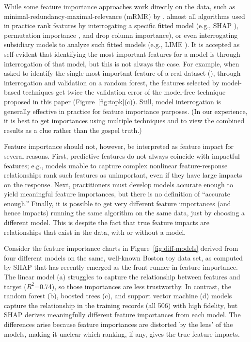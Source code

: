 \documentclass[11pt]{article}
\newcommand{\figref}[1]{Figure~\ref{#1}}
\begin{document}
While some feature importance approaches work directly on the data, such as minimal-redundancy-maximal-relevance (mRMR) by \cite{mRMR}, almost all algorithms used in practice rank features by interrogating a specific fitted model (e.g., SHAP \citep{shap}), permutation importance \citep{RF}, and drop column importance), or even interrogating subsidiary models to analyze such fitted models (e.g., LIME \citealt{lime}). It is accepted as self-evident that identifying the most important features for a model is through interrogation of that  model, but this is not always the case.  For example, when asked to identify the single most important feature of a real dataset (\citep{bulldozer}), through interrogation and validation on a random forest, the features selected by model-based techniques get twice the validation error of the model-free technique proposed in this paper (\figref{fig:topk}(c)). Still, model interrogation is generally effective in practice for feature importance purposes. (In our experience, it is best to get importances using multiple techniques and to view the combined results as a clue rather than the gospel truth.)

Feature importance should not, however, be interpreted as feature impact for several reasons. First, predictive features do not always coincide with impactful features; e.g., models unable to capture complex nonlinear feature-response relationships rank such features as unimportant, even if they have large impacts on the response. Next, practitioners must develop models accurate enough to yield meaningful feature importances, but there is no definition of ``accurate enough.'' Finally, it is possible to get very different feature importances (and hence impacts) running the same algorithm on the same data, just by choosing a different model. This is despite the fact that true feature impacts are relationships that exist in the data, with or without a model.

Consider the feature importance charts in \figref{fig:diff-models} derived from four different models on the same, well-known Boston toy data set, as computed by SHAP that has recently emerged as the front runner in feature importance. The linear model (a) struggles to capture the relationship between features and target ($R^2$=0.74), so those importances are less trustworthy.  In contrast, the random forest (b), boosted trees (c), and support vector machine (d) models capture the relationship in the training records (all 506) with high fidelity, but SHAP derives meaningfully different feature importances from each model. The differences arise because feature importances are distorted by the lens' of the models, making it unclear which ranking, if any, gives the true feature impacts. 
\end{document}
